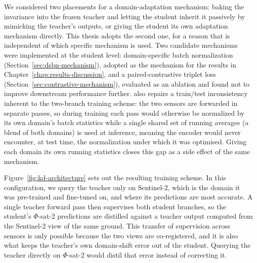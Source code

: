 We considered two placements for a domain-adaptation mechanism: baking the invariance into the frozen teacher and letting the student inherit it passively by mimicking the teacher's outputs, or giving the student its own adaptation mechanism directly.
This thesis adopts the second one, for a reason that is independent of which specific mechanism is used.
Two candidate mechanisms were implemented at the student level: domain-specific batch normalization (Section~\ref{sec:dsbn-mechanism}), adopted as the mechanism for the results in Chapter~\ref{chap:results-discussion}, and a paired-contrastive triplet loss (Section~\ref{sec:contrastive-mechanism}), evaluated as an ablation and found not to improve downstream performance further.
 also repairs a train/test inconsistency inherent to the two-branch training scheme: the two sensors are forwarded in separate passes, so during training each pass would otherwise be normalized by its own domain's batch statistics while a single shared set of running averages (a blend of both domains) is used at inference, meaning the encoder would never encounter, at test time, the normalization under which it was optimised.
Giving each domain its own running statistics closes this gap as a side effect of the same mechanism.

Figure~\ref{fig:kd-architecture} sets out the resulting training scheme.
In this configuration, we query the teacher only on Sentinel-2, which is the domain it was pre-trained and fine-tuned on, and where its predictions are most accurate.
A single teacher forward pass then supervises both student branches, so the student's $\Phi$-sat-2 predictions are distilled against a teacher output computed from the Sentinel-2 view of the same ground.
This transfer of supervision across sensors is only possible because the two views are co-registered, and it is also what keeps the teacher's own domain-shift error out of the student.
Querying the teacher directly on $\Phi$-sat-2 would distil that error instead of correcting it.


